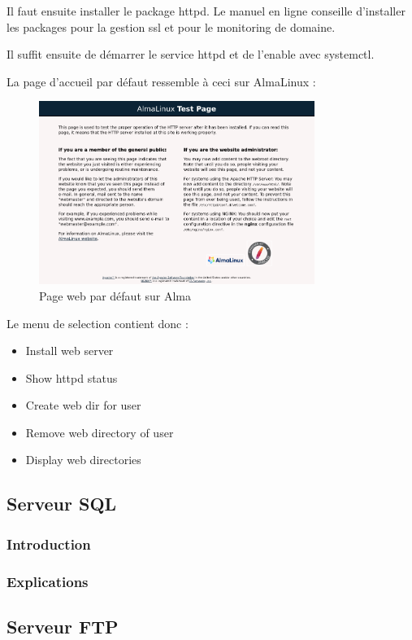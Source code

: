 \documentclass{article}
\begin{document}
	
	Il faut  ensuite installer le package httpd. Le manuel en ligne conseille d'installer les packages pour la gestion ssl et pour le monitoring de domaine.
	
	Il suffit ensuite de démarrer le service httpd et de l'enable avec systemctl.
	
	La page d'accueil par défaut ressemble à ceci sur AlmaLinux :
		\begin{figure}[h]
		\centering
		\includegraphics[width=0.8\textwidth]{webservdefault.png}
		 \caption{Page web par défaut sur Alma}
		\label{fig:your_label}
	\end{figure}
	
	Le menu de selection contient donc :
	\begin{itemize}
		\item Install web server
		\item Show httpd status
		\item Create web dir for user
		\item Remove web directory of user
		\item Display web directories
	\end{itemize}
	
	
	\newpage
	
	\subsection{Serveur SQL}
	\subsubsection{Introduction}
	\subsubsection{Explications}	

	\subsection{Serveur FTP}
\end{document}
